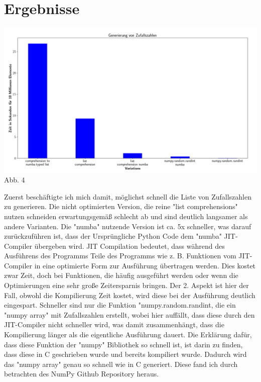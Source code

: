 \documentclass[12pt,a4paper]{article}
\begin{document}
\clearpage
\section{Ergebnisse}

\begin{center}
    \hspace*{-1.5cm}\includegraphics[width=1.2\textwidth]{./diagramme/matplotlib/zufallszahlen.png}
    Abb. 4
\end{center}

Zuerst beschäftigte ich mich damit, möglichst schnell die Liste von Zufallszahlen zu generieren.
Die nicht optimierten Version, die reine "list comprehensions" nutzen schneiden erwartungsgemäß schlecht ab
und sind deutlich langsamer als andere Varianten. Die "numba" nutzende Version ist ca. 5x schneller,
was darauf zurückzuführen ist, dass der Ursprüngliche Python Code dem "numba" JIT-Compiler übergeben wird.
JIT Compilation bedeutet, dass während des Ausführens des Programms Teile des Programms wie z. B. Funktionen
vom JIT-Compiler in eine optimierte Form zur Ausführung übertragen werden. Dies kostet zwar Zeit, doch bei
Funktionen, die häufig ausgeführt werden oder wenn die Optimierungen eine sehr große Zeitersparnis bringen.
Der 2. Aspekt ist hier der Fall, obwohl die Kompilierung Zeit kostet, wird diese bei der Ausführung deutlich eingespart.
Schneller sind nur die Funktion "numpy.random.randint, die ein "numpy array" mit Zufallszahlen erstellt,
wobei hier auffällt, dass diese durch den JIT-Compiler nicht schneller wird, was damit zusammenhängt, dass die Kompilierung
länger als die eigentliche Ausführung dauert. Die Erklärung dafür, dass diese Funktion der "numpy" Bibliothek
so schnell ist, ist darin zu finden, dass diese in C geschrieben wurde und bereits kompiliert wurde. Dadurch wird
das "numpy array" genau so schnell wie in C generiert. Diese fand ich durch betrachten des NumPy Github Repository heraus.
\end{document}
